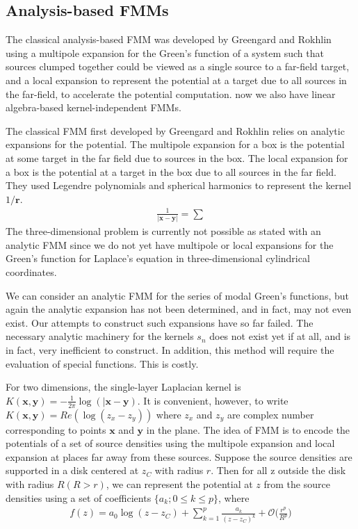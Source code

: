 \documentclass[11pt, oneside]{article}   	%
\begin{document}
\subsection{Analysis-based FMMs}
The classical analysis-based FMM was developed by Greengard and Rokhlin using a multipole expansion for the Green's function of a system such that sources clumped together could be viewed as a single source to a far-field target, and a local expansion to represent the potential at a target due to all sources in the far-field, to accelerate the potential computation. now we also have linear algebra-based kernel-independent FMMs.

The classical FMM \cite{GR} first developed by Greengard and Rokhlin relies on analytic expansions for the potential. The multipole expansion for a box is the potential at some target in the far field due to sources in the box. The local expansion for a box is the potential at a target in the box due to all sources in the far field. They used Legendre polynomials and spherical harmonics to represent the kernel $1/\mathbf{r}$.
\begin{align}
\frac{1}{|\mathbf{x}-\mathbf{y}|} = \sum
\end{align}
The three-dimensional problem is currently not possible as stated with an analytic FMM since we do not yet have multipole or local expansions for the Green's function for Laplace's equation in three-dimensional cylindrical coordinates.

We can consider an analytic FMM for the series of modal Green's functions, but again the analytic expansion has not been determined, and in fact, may not even exist. Our attempts to construct such expansions have so far failed. The necessary analytic machinery for the kernels $s_n$ does not exist yet if at all, and is in fact, very inefficient to construct. In addition, this method will require the evaluation of special functions. This is costly.

For two dimensions, the single-layer Laplacian kernel is $K(\mathbf{x},\mathbf{y})=-\frac{1}{2\pi}\log(|\mathbf{x}-\mathbf{y})$. It is convenient, however, to write $K(\mathbf{x},\mathbf{y})=Re(\log(z_x-z_y))$ where $z_x$ and $z_y$ are complex number corresponding to points $\mathbf{x}$ and $\mathbf{y}$ in the plane. The idea of FMM is to encode the potentials of a set of source densities using the multipole expansion and local expansion at places far away from these sources. Suppose the source densities are supported in a disk centered at $z_C$ with radius $r$. Then for all z outside the disk with radius $R (R > r)$, we can represent the potential at $z$ from the source densities using a set of coefficients $\{a_k ; 0 \le k \le p\}$, where
\begin{align}
f(z)=a_0\log(z-z_C)+\sum_{k=1}^p\frac{a_k}{(z-z_C)^k}+\mathcal{O}\bigg(\frac{r^p}{R^p}\bigg)
\end{align}
\end{document}
